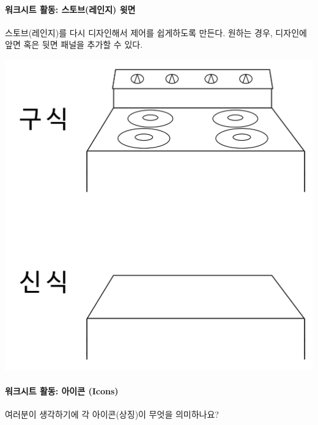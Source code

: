 \documentclass[]{article}
\begin{document}
\mbox{}\paragraph{워크시트 활동: 스토브(레인지) 윗면}\label{section-266}

스토브(레인지)를 다시 디자인해서 제어를 쉽게하도록 만든다. 원하는 경우,
디자인에 앞면 혹은 뒷면 패널을 추가할 수 있다.

\includegraphics{csunplugged/06-part/img/ch20-hci/19-hci-05-stove.png}

\mbox{}\paragraph{워크시트 활동: 아이콘 (Icons)}\label{icons}

여러분이 생각하기에 각 아이콘(상징)이 무엇을 의미하나요?
\end{document}
